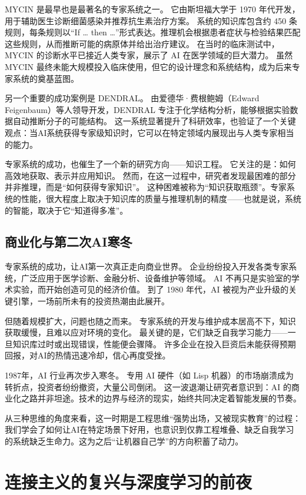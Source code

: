 MYCIN 是最早也是最著名的专家系统之一。  
它由斯坦福大学于 1970 年代开发，用于辅助医生诊断细菌感染并推荐抗生素治疗方案。  
系统的知识库包含约 450 条规则，每条规则以“If … then …”形式表达。推理机会根据患者症状与检验结果匹配这些规则，从而推断可能的病原体并给出治疗建议。  
在当时的临床测试中，MYCIN 的诊断水平已接近人类专家，展示了 AI 在医学领域的巨大潜力。  
虽然 MYCIN 最终未能大规模投入临床使用，但它的设计理念和系统结构，成为后来专家系统的奠基蓝图。

另一个重要的成功案例是 DENDRAL。  
由爱德华·费根鲍姆（Edward Feigenbaum）等人领导开发，DENDRAL 专注于化学结构分析，能够根据实验数据自动推断分子的可能结构。  
这一系统显著提升了科研效率，也验证了一个关键观点：当AI系统获得专家级知识时，它可以在特定领域内展现出与人类专家相当的能力。

专家系统的成功，也催生了一个新的研究方向——知识工程。  
它关注的是：如何高效地获取、表示并应用知识。  
然而，在这一过程中，研究者发现最困难的部分并非推理，而是“如何获得专家知识”。  
这种困难被称为“知识获取瓶颈”。专家系统的性能，很大程度上取决于知识库的质量与推理机制的精度——也就是说，系统的智能，取决于它“知道得多准”。

\subsection{商业化与第二次AI寒冬}

专家系统的成功，让AI第一次真正走向商业世界。  
企业纷纷投入开发各类专家系统，广泛应用于医学诊断、金融分析、设备维护等领域。  
AI 不再只是实验室的学术实验，而开始创造可见的经济价值。  
到了 1980 年代，AI 被视为产业升级的关键引擎，一场前所未有的投资热潮由此展开。

但随着规模扩大，问题也随之而来。  
专家系统的开发与维护成本居高不下，知识获取缓慢，且难以应对环境的变化。  
最关键的是，它们缺乏自我学习能力——一旦知识库过时或出现错误，性能便会骤降。  
许多企业在投入巨资后未能获得预期回报，对AI的热情迅速冷却，信心再度受挫。

1987年，AI 行业再次步入寒冬。  
专用 AI 硬件（如 Lisp 机器）的市场崩溃成为转折点，投资者纷纷撤资，大量公司倒闭。  
这一波退潮让研究者意识到：AI 的商业化之路并非坦途。技术的边界与经济的现实，始终共同决定着智能发展的节奏。

从三种思维的角度来看，这一时期是工程思维“强势出场，又被现实教育”的过程：我们学会了如何让AI在特定场景下好用，也意识到仅靠工程堆叠、缺乏自我学习的系统缺乏生命力。这为之后“让机器自己学”的方向积蓄了动力。

\section{连接主义的复兴与深度学习的前夜}

